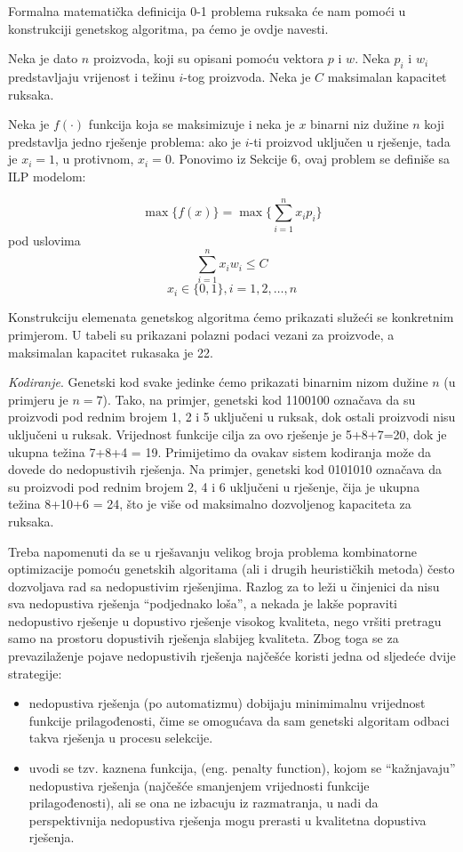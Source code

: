 \documentclass[a4paper, utf8, 11pt, colorlinks]{book}
\begin{document}
Formalna matematička definicija 0-1 problema ruksaka će nam pomoći u konstrukciji genetskog algoritma, pa ćemo je ovdje navesti.

Neka je dato $n$ proizvoda, koji su opisani pomoću vektora $p$ i $w$. Neka $p_i$ i $w_i$ predstavljaju vrijenost i težinu $i$-tog proizvoda. Neka je $C$ maksimalan kapacitet ruksaka.

Neka je $f(\cdot)$ funkcija koja se maksimizuje i neka je $x$ binarni niz dužine $n$ koji predstavlja jedno rješenje problema: ako je $i$-ti proizvod uključen u rješenje, tada je $x_i = 1$, u protivnom, $x_i =0$. Ponovimo iz Sekcije 6, ovaj problem se definiše sa ILP modelom:

$$\max \{f(x)\} = \max \{\sum_{i=1}^{n}x_ip_i\}$$
pod uslovima 
$$\sum_{i=1}^{n}x_iw_i\leqslant C$$
$$x_i\in\{0,1\}, i = 1,2,\ldots,n$$

Konstrukciju elemenata genetskog algoritma ćemo prikazati služeći se konkretnim primjerom. U tabeli su prikazani polazni podaci vezani za proizvode, a maksimalan kapacitet rukasaka je 22. 

\emph{Kodiranje}. Genetski kod svake jedinke ćemo prikazati binarnim nizom dužine $n$ (u primjeru je $n=7$). Tako, na primjer, genetski kod 1100100 označava da su proizvodi pod rednim brojem 1, 2 i 5 uključeni u ruksak, dok ostali proizvodi nisu uključeni u ruksak. Vrijednost funkcije cilja za ovo rješenje je 5+8+7=20, dok je ukupna težina 7+8+4 = 19. 
Primijetimo da ovakav sistem kodiranja može da dovede do nedopustivih rješenja. Na primjer, genetski kod 0101010 označava da su proizvodi pod rednim brojem 2, 4 i 6 uključeni u rješenje, čija je ukupna težina 8+10+6 = 24, što je više od maksimalno dozvoljenog kapaciteta za ruksaka.

Treba napomenuti da se u rješavanju velikog broja problema kombinatorne optimizacije pomoću genetskih algoritama (ali i drugih heurističkih metoda) često dozvoljava rad sa nedopustivim rješenjima. Razlog za to leži u činjenici da nisu sva nedopustiva rješenja ``podjednako loša'', a nekada je lakše popraviti nedopustivo rješenje u dopustivo rješenje visokog kvaliteta, nego vršiti pretragu samo na prostoru dopustivih rješenja slabijeg kvaliteta.  Zbog toga se za prevazilaženje pojave nedopustivih rješenja najčešće koristi jedna od sljedeće dvije strategije: 
\begin{itemize}
	\item
	nedopustiva rješenja (po automatizmu) dobijaju minimimalnu vrijednost funkcije prilagođenosti, čime se omogućava da sam genetski algoritam odbaci takva rješenja u procesu selekcije. 
	
	\item uvodi se tzv. kaznena funkcija, (eng. penalty function), kojom se ``kažnjavaju'' nedopustiva rješenja (najčešće smanjenjem vrijednosti funkcije prilagođenosti), ali se ona ne izbacuju iz razmatranja, u nadi da perspektivnija nedopustiva rješenja mogu prerasti u kvalitetna dopustiva rješenja.
\end{itemize}
\end{document}
